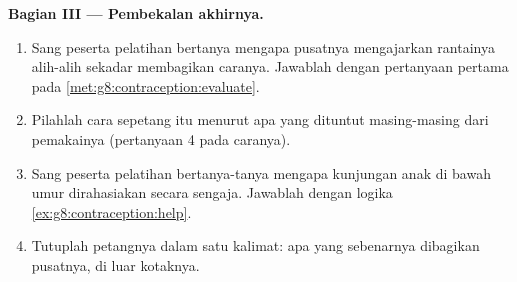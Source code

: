 \begin{problem}
\medskip\noindent\textbf{Bagian III --- Pembekalan akhirnya.}
\begin{enumerate}[resume]
  \item Sang peserta pelatihan bertanya mengapa pusatnya
        mengajarkan rantainya alih-alih sekadar membagikan
        caranya. Jawablah dengan pertanyaan pertama pada
        \cref{met:g8:contraception:evaluate}.
  \item Pilahlah cara sepetang itu menurut apa yang
        dituntut masing-masing dari pemakainya (pertanyaan 4
        pada caranya).
  \item Sang peserta pelatihan bertanya-tanya mengapa
        kunjungan anak di bawah umur dirahasiakan secara
        sengaja. Jawablah dengan logika
        \cref{ex:g8:contraception:help}.
  \item Tutuplah petangnya dalam satu kalimat: apa yang
        sebenarnya dibagikan pusatnya, di luar kotaknya.
\end{enumerate}
\end{problem}
